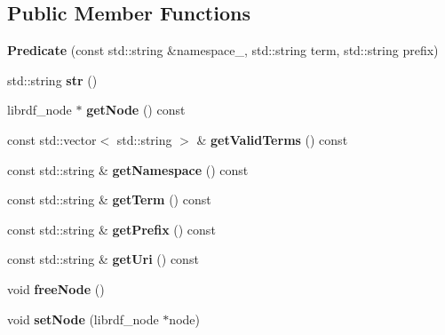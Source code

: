 \subsection*{Public Member Functions}
\begin{DoxyCompactItemize}
\item 
\mbox{\label{classsemsim_1_1Predicate_a111a30f2cf259153b4f186b308b6716f}} 
{\bfseries Predicate} (const std\+::string \&namespace\+\_\+, std\+::string term, std\+::string prefix)
\item 
\mbox{\label{classsemsim_1_1Predicate_a47fed0b10781d69cc6e359bcec16eb71}} 
std\+::string {\bfseries str} ()
\item 
\mbox{\label{classsemsim_1_1Predicate_a6e4ea55d33e692cdb894940c3708cabb}} 
librdf\+\_\+node $\ast$ {\bfseries get\+Node} () const
\item 
\mbox{\label{classsemsim_1_1Predicate_a4a1ffe837216303654416b725684b9db}} 
const std\+::vector$<$ std\+::string $>$ \& {\bfseries get\+Valid\+Terms} () const
\item 
\mbox{\label{classsemsim_1_1Predicate_aefb90236a7934d93cce5798723f54661}} 
const std\+::string \& {\bfseries get\+Namespace} () const
\item 
\mbox{\label{classsemsim_1_1Predicate_a1a62bbbe1ac5e3a28a15fda049d4ada4}} 
const std\+::string \& {\bfseries get\+Term} () const
\item 
\mbox{\label{classsemsim_1_1Predicate_ad7115549cf9b25cbb665f5c2bcba67d4}} 
const std\+::string \& {\bfseries get\+Prefix} () const
\item 
\mbox{\label{classsemsim_1_1Predicate_add37b6df8a8bf63600966a3ab24236d9}} 
const std\+::string \& {\bfseries get\+Uri} () const
\item 
\mbox{\label{classsemsim_1_1Predicate_aa8a95f5f9e0bffbb8d6df9c8767a6b01}} 
void {\bfseries free\+Node} ()
\item 
\mbox{\label{classsemsim_1_1Predicate_a56b15a4d95c7f6e4645e954e5d5d3d13}} 
void {\bfseries set\+Node} (librdf\+\_\+node $\ast$node)
\end{DoxyCompactItemize}
